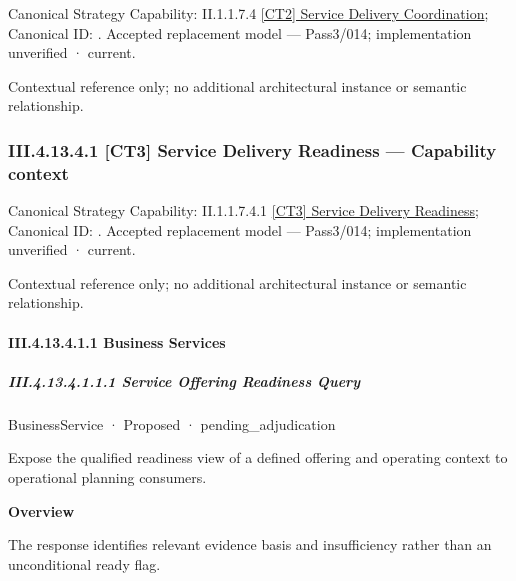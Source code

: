 {\small Canonical Strategy Capability: II.1.1.7.4 \hyperref[element:5d3586334499415e94f38d3680834f47]{[CT2] Service Delivery Coordination}; Canonical ID: \texttt{}. Accepted replacement model — Pass3/014; implementation unverified · current.}\par
Contextual reference only; no additional architectural instance or semantic relationship.\par
\subsubsection*{III.4.13.4.1 [CT3] Service Delivery Readiness — Capability context}
\label{navigation:III.4.13.4.1}

{\small Canonical Strategy Capability: II.1.1.7.4.1 \hyperref[element:cfce47b7e3c1424eba10348f9eb7ea9c]{[CT3] Service Delivery Readiness}; Canonical ID: \texttt{}. Accepted replacement model — Pass3/014; implementation unverified · current.}\par
Contextual reference only; no additional architectural instance or semantic relationship.\par
\paragraph*{III.4.13.4.1.1 Business Services}
\label{navigation:III.4.13.4.1.1}

\subparagraph*{III.4.13.4.1.1.1 Service Offering Readiness Query}
\label{navigation:III.4.13.4.1.1.1}

\label{element:3b0bdc7bc18940208511f39e43d5357a}
{\small BusinessService · Proposed · pending\_adjudication}\par

Expose the qualified readiness view of a defined offering and operating context to operational planning consumers.



\textbf{Overview}



The response identifies relevant evidence basis and insufficiency rather than an unconditional ready flag.



